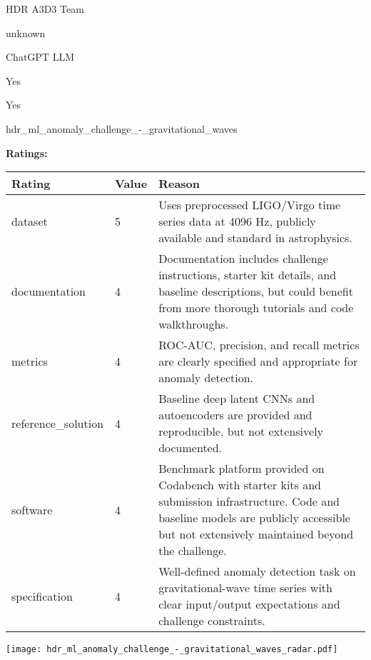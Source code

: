 {{\begin{description}[labelwidth=4cm, labelsep=1em, leftmargin=4cm, itemsep=0.1em, parsep=0em]
  \item[contact.name:] HDR A3D3 Team
  \item[contact.email:] unknown
  \item[results.links.name:] ChatGPT LLM
  \item[fair.reproducible:] Yes
  \item[fair.benchmark\_ready:] Yes
  \item[id:] hdr\_ml\_anomaly\_challenge\_-\_gravitational\_waves
  \item[Citations:] \cite{campolongo2025buildingmachinelearningchallenges}
\end{description}

{\bf Ratings:} ~ \\

\begin{tabular}{p{} p{} p{}}
\hline
Rating & Value & Reason \\
\hline
dataset & 5 & Uses preprocessed LIGO/Virgo time series data at 4096 Hz, publicly available and standard in astrophysics.
 \\
documentation & 4 & Documentation includes challenge instructions, starter kit details, and baseline descriptions,
but could benefit from more thorough tutorials and code walkthroughs.
 \\
metrics & 4 & ROC-AUC, precision, and recall metrics are clearly specified and appropriate for anomaly detection.
 \\
reference\_solution & 4 & Baseline deep latent CNNs and autoencoders are provided and reproducible, but not extensively documented.
 \\
software & 4 & Benchmark platform provided on Codabench with starter kits and submission infrastructure.
Code and baseline models are publicly accessible but not extensively maintained beyond the challenge.
 \\
specification & 4 & Well-defined anomaly detection task on gravitational-wave time series with clear input/output
expectations and challenge constraints.
 \\
\hline
\end{tabular}

\texttt{[image: hdr\_ml\_anomaly\_challenge\_-\_gravitational\_waves\_radar.pdf]}
}}
\clearpage
